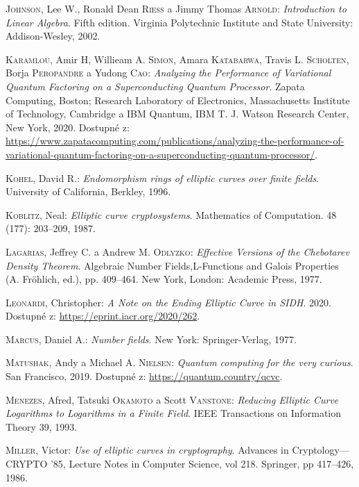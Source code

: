 \documentclass[12pt]{report}
\begin{document}
\begin{thebibliography}{97}
\textsc{Johnson}, Lee W., Ronald Dean \textsc{Riess} a Jimmy Thomas \textsc{Arnold}: \textit{Introduction to Linear Algebra}. Fifth edition. Virginia Polytechnic Institute and State University: Addison-Wesley, 2002.

\textsc{Karamlou}, Amir H, Willieam A. \textsc{Simon}, Amara \textsc{Katabarwa}, Travis L. \textsc{Scholten}, Borja \textsc{Peropandre} a Yudong \textsc{Cao}: \textit{Analyzing the Performance of Variational Quantum Factoring on a Superconducting Quantum Processor}. Zapata Computing, Boston; Research Laboratory of Electronics, Massachusetts Institute of Technology, Cambridge a IBM Quantum, IBM T. J. Watson Research Center, New York, 2020. Dostupné z: \url{https://www.zapatacomputing.com/publications/analyzing-the-performance-of-variational-quantum-factoring-on-a-superconducting-quantum-processor/}.

\textsc{Kohel}, David R.: \textit{Endomorphism rings of elliptic curves over finite fields}. University of California, Berkley, 1996.

\textsc{Koblitz}, Neal: \textit{Elliptic curve cryptosystems}. Mathematics of Computation. 48 (177): 203–209, 1987.

\textsc{Lagarias}, Jeffrey C. a Andrew M. \textsc{Odlyzko}: \textit{Effective Versions of the Chebotarev Density Theorem}. Algebraic Number Fields,L-Functions and Galois Properties (A. Fröhlich, ed.), pp. 409–464. New York, London: Academic Press, 1977.

\textsc{Leonardi}, Christopher: \textit{A Note on the Ending Elliptic Curve in SIDH}. 2020. Dostupné z: \url{https://eprint.iacr.org/2020/262}.

\textsc{Marcus}, Daniel A.: \textit{Number fields}. New York: Springer-Verlag, 1977.

\textsc{Matushak}, Andy a Michael A. \textsc{Nielsen}: \textit{Quantum computing for the very curious}. San Francisco, 2019. Dostupné z: \url{https://quantum.country/qcvc}.

\textsc{Menezes}, Afred, Tatsuki \textsc{Okamoto} a Scott \textsc{Vanstone}: \textit{Reducing Elliptic Curve Logarithms to Logarithms in a Finite Field}. IEEE Transactions on Information Theory 39, 1993.

\textsc{Miller}, Victor: \textit{Use of elliptic curves in cryptography}. Advances in Cryptology—CRYPTO ’85, Lecture Notes in Computer Science, vol 218. Springer, pp 417–426, 1986.


\end{thebibliography}
\end{document}
